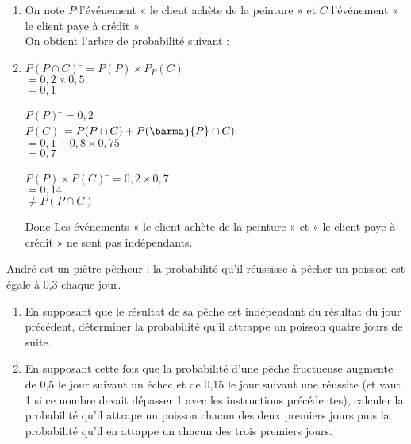 \documentclass[a4paper,11pt,exos]{nsi} %
\begin{document}
\begin{enumerate}
    \item On note $P$ l'événement « le client achète de la peinture » et $C$ l'événement « le client paye à crédit ».\\
    On obtient l'arbre de probabilité suivant :
    \def\abun{$P$}
 \def\alun{0,2}
 \def\abdeux{$\barmaj{P}$}
 \def\aldeux{0,8}
 \def\abtrois{$C$}
 \def\altrois{0,5}
 \def\abquatre{$\barmaj{C}$}
 \def\alquatre{0,5}
 
\def\abcinq{$C$}
 \def\alcinq{0,75}
 \def\absix{$\barmaj{C}$}
 \def\alsix{0,25}
 \begin{center}
 \arbreproba
 \end{center}
    \item \begin{multicols}{3}
        \begin{tabbing}
            $P(P\cap C)$ \=$=P(P)\times P_P(C)$\\
                        \>$=0,2\times 0,5$\\
                        \>$=0,1$
        \end{tabbing}
        \vfill\null
        \columnbreak
        \begin{tabbing}
            $P(P)$ \=$=0,2$\\[.5em]
            $P(C)$ \=$=P(P\cap C)+P(\barmaj{P}\cap C)$\\
                    \>$=0,1+0,8\times 0,75$\\
                    \>$=0,7$
        \end{tabbing}
        
        \begin{tabbing}
            $P(P)\times P(C)$ \=$=0,2\times 0,7$\\
                            \>$=0,14$\\
                            \>$\neq P(P\cap C)$
        \end{tabbing}
    \end{multicols}
    Donc Les événements « le client achète de la peinture » et « le client paye à crédit » ne sont pas indépendants.
\end{enumerate}

\exo{}
\textcolor{UGLiBlue}{André est un piètre  pêcheur : la probabilité qu'il réussisse à pêcher un poisson est égale à 0,3 chaque jour.
\begin{enumerate}
    \item En supposant que le résultat de sa pêche est indépendant du résultat du jour précédent, déterminer la probabilité qu'il attrappe un poisson quatre jours de suite.
    \item En supposant cette fois que la probabilité d'une pêche fructueuse augmente de 0,5 le jour suivant un échec et de 0,15 le jour suivant une réussite (et vaut 1 si ce nombre devait dépasser 1 avec les instructions précédentes), calculer la probabilité qu'il attrape un poisson chacun des deux premiers jours puis la probabilité qu'il en attappe un chacun des trois premiers jours.
\end{enumerate}}
\end{document}
